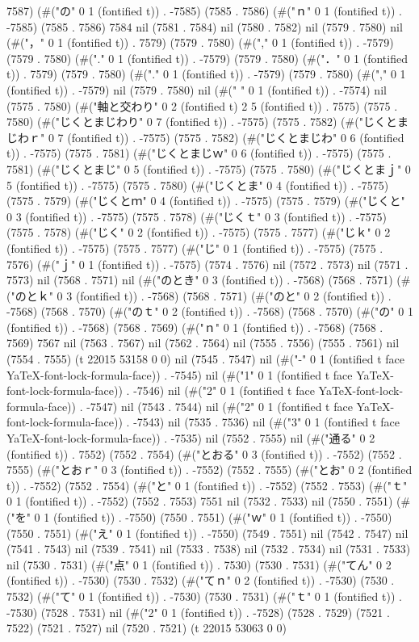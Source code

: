 7587) (#("の" 0 1 (fontified t)) . -7585) (7585 . 7586) (#("ｎ" 0 1 (fontified t)) . -7585) (7585 . 7586) 7584 nil (7581 . 7584) nil (7580 . 7582) nil (7579 . 7580) nil (#("，" 0 1 (fontified t)) . 7579) (7579 . 7580) (#("," 0 1 (fontified t)) . -7579) (7579 . 7580) (#("." 0 1 (fontified t)) . -7579) (7579 . 7580) (#("．" 0 1 (fontified t)) . 7579) (7579 . 7580) (#("." 0 1 (fontified t)) . -7579) (7579 . 7580) (#("," 0 1 (fontified t)) . -7579) nil (7579 . 7580) nil (#(" " 0 1 (fontified t)) . -7574) nil (7575 . 7580) (#("軸と交わり" 0 2 (fontified t) 2 5 (fontified t)) . 7575) (7575 . 7580) (#("じくとまじわり" 0 7 (fontified t)) . -7575) (7575 . 7582) (#("じくとまじわｒ" 0 7 (fontified t)) . -7575) (7575 . 7582) (#("じくとまじわ" 0 6 (fontified t)) . -7575) (7575 . 7581) (#("じくとまじｗ" 0 6 (fontified t)) . -7575) (7575 . 7581) (#("じくとまじ" 0 5 (fontified t)) . -7575) (7575 . 7580) (#("じくとまｊ" 0 5 (fontified t)) . -7575) (7575 . 7580) (#("じくとま" 0 4 (fontified t)) . -7575) (7575 . 7579) (#("じくとｍ" 0 4 (fontified t)) . -7575) (7575 . 7579) (#("じくと" 0 3 (fontified t)) . -7575) (7575 . 7578) (#("じくｔ" 0 3 (fontified t)) . -7575) (7575 . 7578) (#("じく" 0 2 (fontified t)) . -7575) (7575 . 7577) (#("じｋ" 0 2 (fontified t)) . -7575) (7575 . 7577) (#("じ" 0 1 (fontified t)) . -7575) (7575 . 7576) (#("ｊ" 0 1 (fontified t)) . -7575) (7574 . 7576) nil (7572 . 7573) nil (7571 . 7573) nil (7568 . 7571) nil (#("のとき" 0 3 (fontified t)) . -7568) (7568 . 7571) (#("のとｋ" 0 3 (fontified t)) . -7568) (7568 . 7571) (#("のと" 0 2 (fontified t)) . -7568) (7568 . 7570) (#("のｔ" 0 2 (fontified t)) . -7568) (7568 . 7570) (#("の" 0 1 (fontified t)) . -7568) (7568 . 7569) (#("ｎ" 0 1 (fontified t)) . -7568) (7568 . 7569) 7567 nil (7563 . 7567) nil (7562 . 7564) nil (7555 . 7556) (7555 . 7561) nil (7554 . 7555) (t 22015 53158 0 0) nil (7545 . 7547) nil (#("-" 0 1 (fontified t face YaTeX-font-lock-formula-face)) . -7545) nil (#("1" 0 1 (fontified t face YaTeX-font-lock-formula-face)) . -7546) nil (#("2" 0 1 (fontified t face YaTeX-font-lock-formula-face)) . -7547) nil (7543 . 7544) nil (#("2" 0 1 (fontified t face YaTeX-font-lock-formula-face)) . -7543) nil (7535 . 7536) nil (#("3" 0 1 (fontified t face YaTeX-font-lock-formula-face)) . -7535) nil (7552 . 7555) nil (#("通る" 0 2 (fontified t)) . 7552) (7552 . 7554) (#("とおる" 0 3 (fontified t)) . -7552) (7552 . 7555) (#("とおｒ" 0 3 (fontified t)) . -7552) (7552 . 7555) (#("とお" 0 2 (fontified t)) . -7552) (7552 . 7554) (#("と" 0 1 (fontified t)) . -7552) (7552 . 7553) (#("ｔ" 0 1 (fontified t)) . -7552) (7552 . 7553) 7551 nil (7532 . 7533) nil (7550 . 7551) (#("を" 0 1 (fontified t)) . -7550) (7550 . 7551) (#("ｗ" 0 1 (fontified t)) . -7550) (7550 . 7551) (#("え" 0 1 (fontified t)) . -7550) (7549 . 7551) nil (7542 . 7547) nil (7541 . 7543) nil (7539 . 7541) nil (7533 . 7538) nil (7532 . 7534) nil (7531 . 7533) nil (7530 . 7531) (#("点" 0 1 (fontified t)) . 7530) (7530 . 7531) (#("てん" 0 2 (fontified t)) . -7530) (7530 . 7532) (#("てｎ" 0 2 (fontified t)) . -7530) (7530 . 7532) (#("て" 0 1 (fontified t)) . -7530) (7530 . 7531) (#("ｔ" 0 1 (fontified t)) . -7530) (7528 . 7531) nil (#("2" 0 1 (fontified t)) . -7528) (7528 . 7529) (7521 . 7522) (7521 . 7527) nil (7520 . 7521) (t 22015 53063 0 0) 